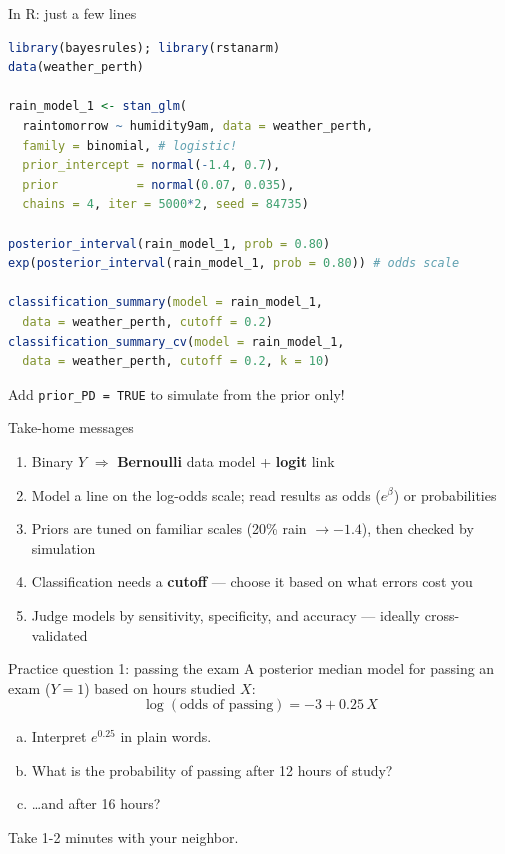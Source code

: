 \documentclass[aspectratio=43,11pt]{beamer}
\newcommand{\hl}[1]{\textcolor{warm}{\textbf{#1}}}
\begin{document}
\begin{frame}[fragile]{In R: just a few lines}
\begin{lstlisting}[language=R]
library(bayesrules); library(rstanarm)
data(weather_perth)

rain_model_1 <- stan_glm(
  raintomorrow ~ humidity9am, data = weather_perth,
  family = binomial, # logistic!
  prior_intercept = normal(-1.4, 0.7),
  prior           = normal(0.07, 0.035),
  chains = 4, iter = 5000*2, seed = 84735)

posterior_interval(rain_model_1, prob = 0.80)
exp(posterior_interval(rain_model_1, prob = 0.80)) # odds scale

classification_summary(model = rain_model_1,
  data = weather_perth, cutoff = 0.2)
classification_summary_cv(model = rain_model_1,
  data = weather_perth, cutoff = 0.2, k = 10)
\end{lstlisting}
  \footnotesize\color{gray} Add \texttt{prior\_PD = TRUE} to simulate from the prior only!
\end{frame}

\begin{frame}{Take-home messages}
  \begin{enumerate}
    \setlength\itemsep{0.6em}
    \item Binary $Y$ $\Rightarrow$ \hl{Bernoulli} data model + \hl{logit} link
    \item Model a line on the log-odds scale; read results as odds ($e^{\beta}$) or probabilities
    \item Priors are tuned on familiar scales (20\% rain $\to -1.4$), then checked by simulation
    \item Classification needs a \hl{cutoff} --- choose it based on what errors cost you
    \item Judge models by sensitivity, specificity, and accuracy --- ideally cross-validated
  \end{enumerate}
\end{frame}

\begin{frame}{Practice question 1: passing the exam}
  A posterior median model for passing an exam ($Y=1$) based on hours studied $X$:
  \[ \log(\text{odds of passing}) = -3 + 0.25\,X \]
  \begin{enumerate}[(a)]
    \setlength\itemsep{0.6em}
    \item Interpret $e^{0.25}$ in plain words.
    \item What is the probability of passing after 12 hours of study?
    \item \dots and after 16 hours?
  \end{enumerate}
  \vspace{1em}
  \centering\small\color{gray} Take 1-2 minutes with your neighbor.
\end{frame}
\end{document}
